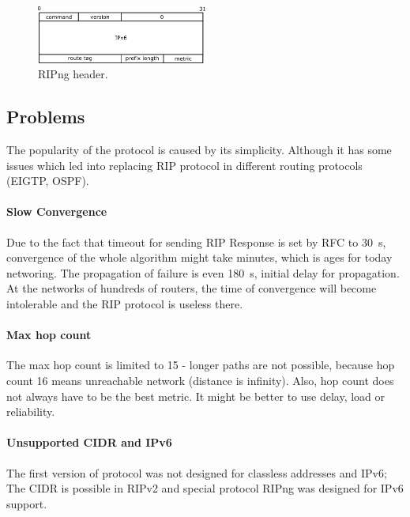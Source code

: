 \documentclass[10pt,a4paper,titlepage]{article}
\begin{document}
                \begin{figure}[h!]
                    \begin{center}
                        \includegraphics[width=0.50\textwidth]{ripng_h.png}
                        \caption{RIPng header. \label{fig:RIPngheader}}
                    \end{center}
                \end{figure}

        \subsection{Problems}
            The popularity of the protocol is caused by its simplicity. Although it has some issues which led into replacing
            RIP protocol in different routing protocols (EIGTP, OSPF).
            \paragraph{Slow Convergence}
                Due to the fact that timeout for sending RIP Response is set by RFC to 30~s, convergence of the whole algorithm
                might take minutes, which is ages for today networing. The propagation of failure is even 180~s, initial delay
                for propagation. At the networks of hundreds of routers, the time of convergence will become intolerable and
                the RIP protocol is useless there.
            \paragraph{Max hop count}
                The max hop count is limited to 15 - longer paths are not possible, because hop count 16 means unreachable network
                (distance is infinity). Also, hop count does not always have to be the best metric. It might be better to use delay,
                load or reliability.
            \paragraph{Unsupported CIDR and IPv6}
                The first version of protocol was not designed for classless addresses and IPv6; The CIDR is possible in RIPv2
                and special protocol RIPng was designed for IPv6 support. 
        
\end{document}
